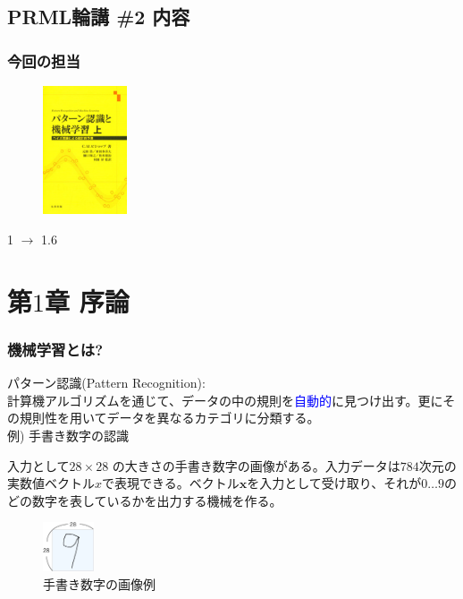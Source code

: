\documentclass[dvipdfmx]{beamer}
\theoremstyle{definition}
\begin{document}
\subsection{PRML輪講 \#2 内容}
\begin{frame}
  \frametitle{今回の担当}
  \begin{figure}[htb]
    \centering
    \includegraphics[width=2.5cm,clip]{res/prml.eps}
  \end{figure}
  1 $\to$ 1.6
\end{frame}

\section{第$1$章 \enspace 序論}

\begin{frame}
  \frametitle{機械学習とは?}
  パターン認識(Pattern Recognition): \\ 計算機アルゴリズムを通じて、データの中の規則を\textcolor{blue}{自動的}に見つけ出す。更にその規則性を用いてデータを異なるカテゴリに分類する。
  \\
  例) 手書き数字の認識
   
  入力として$28 \times 28$ の大きさの手書き数字の画像がある。入力データは$784$次元の実数値ベクトル$x$で表現できる。ベクトル$\bm{x}$を入力として受け取り、それが$0 \ldots 9 $のどの数字を表しているかを出力する機械を作る。
  \begin{figure}[htb]
    \centering
    \includegraphics[width=1.5cm,clip]{res/handwritten.eps}
    \caption{手書き数字の画像例}
  \end{figure}
\end{frame}
\end{document}

